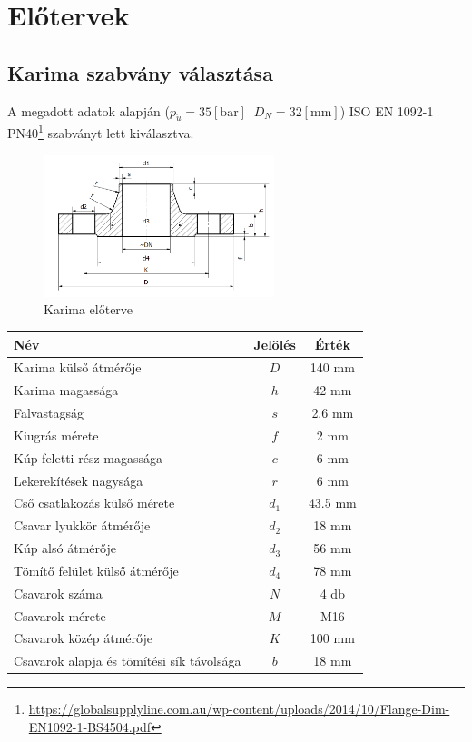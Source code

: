 \documentclass[10pt, a4paper]{article}
\newcommand{\baar}{\mathrm{\left[bar\right]}}
\newcommand{\mm}{\mathrm{\left[mm\right]}}
\begin{document}
	\section{Előtervek}
	\subsection{Karima szabvány választása}
	A megadott adatok alapján ($p_{\ddot{u}} = 35\baar\;\;D_N = 32\mm$) ISO EN 1092-1 PN40\footnote{\url{https://globalsupplyline.com.au/wp-content/uploads/2014/10/Flange-Dim-EN1092-1-BS4504.pdf}} szabványt lett kiválasztva.
	\begin{figure}[h]
		\centering
		\includegraphics[width=0.6\textwidth]{ karima_eloterv.png }
		\caption{Karima előterve}
		\label{fig:karima}
	\end{figure}
	\renewcommand{\arraystretch}{1.4}
	\begin{table}[h]
		\centering
		\begin{tabular}{l|c|c}
			\textbf{Név}                              & \textbf{Jelölés} & \textbf{Érték} \\ \hline
			Karima külső átmérője                     & $D$ & 140 mm \\ 
			Karima magassága                          & $h$ & 42 mm \\ 
			Falvastagság                              & $s$ & 2.6 mm \\ 
			Kiugrás mérete                            & $f$ & 2 mm \\ 
			Kúp feletti rész magassága                & $c$                & 6 mm \\ 
			Lekerekítések nagysága                    & $r$                & 6 mm \\ 
			Cső csatlakozás külső mérete              & $d_1$             & 43.5 mm \\ 
			Csavar lyukkör átmérője                   & $d_2$             & 18 mm \\ 
			Kúp alsó átmérője                         & $d_3$             & 56 mm \\ 
			Tömítő felület külső átmérője             & $d_4$             & 78 mm \\ 
			Csavarok száma                            & $N$                & 4 db \\ 
			Csavarok mérete                           & $M$                & M16 \\ 
			Csavarok közép átmérője                   & $K$                & 100 mm \\ 
			Csavarok alapja és tömítési sík távolsága & $b$                & 18 mm \\ 
		\end{tabular}
	\end{table}
	\renewcommand{\arraystretch}{1}
\end{document}
